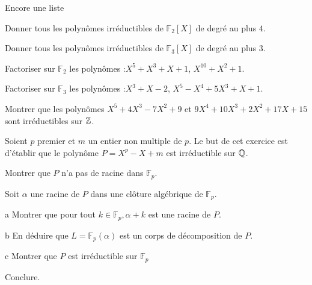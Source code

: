 \documentclass[french]{report}
\begin{document}
\begin{exo}
    Encore une liste
    \begin{q}{1}
        Donner tous les polynômes irréductibles de \(\mathbb{F}_2[X]\) de degré
        au plus \(4\).
    \end{q}
    \begin{q}{2}
        Donner tous les polynômes irréductibles de \(\mathbb{F}_3[X]\) de degré
        au plus \(3\).
    \end{q}
    \begin{q}{3}
        Factoriser sur \(\mathbb{F}_2\) les polynômes :\(X^5+X^3+X+1\), \(X^{10}+X^2+1\).
    \end{q}
    \begin{q}{4}
        Factoriser sur \(\mathbb{F}_3\) les polynômes :\(X^3+X-2\), \(X^5-X^4+5X^3+X+1\).
    \end{q}
    \begin{q}{5}
        Montrer que les polynômes \(X^5+4X^3-7X^2+9\) et \(9X^4+10X^3+2X^2+17X+15\)
        sont irréductibles sur \(\mathbb{Z}\).
    \end{q}
\end{exo}

\begin{exo}
    Soient \(p\) premier et \(m\) un entier non multiple de \(p\). Le but de cet exercice
    est d'établir que le polynôme \(P=X^p-X+m\) est irréductible sur \(\mathbb{Q}\).
    \begin{q}{1}
        Montrer que \(P\) n'a pas de racine dans \(\mathbb{F}_p\).
    \end{q}
    \begin{q}{2}
        Soit \(\alpha\) une racine de \(P\) dans une clôture algébrique de
        \(\mathbb{F}_p\).
        \begin{q}{a}
            Montrer que pour tout \(k\in\mathbb{F}_p, \alpha+k\) est une racine de \(P\).
        \end{q}
        \begin{q}{b}
            En déduire que \(L=\mathbb{F}_p(\alpha)\) est un corps de décomposition
            de \(P\).
        \end{q}
        \begin{q}{c}
            Montrer que \(P\) est irréductible sur \(\mathbb{F}_p\)
        \end{q}
    \end{q}
    \begin{q}{3}
        Conclure.
    \end{q}
\end{exo}
\end{document}
